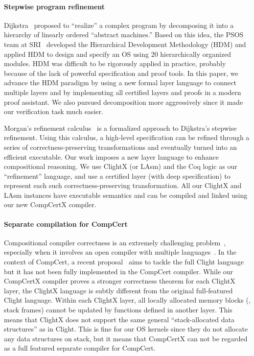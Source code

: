 \paragraph{Stepwise program refinement}
Dijkstra~\cite{Dijkstra72} proposed to ``realize'' a complex program
by decomposing it into a hierarchy of linearly ordered ``abstract
machines.''  Based on this idea, the PSOS team at SRI~\cite{psos80}
developed the Hierarchical Development Methodology (HDM) and applied
HDM to design and specify an OS using 20 hierarchically organized
modules. HDM was difficult to be rigorously applied in practice,
probably because of the lack of powerful specification and proof
tools. In this paper, we advance the HDM paradigm by using a new formal
layer language to connect multiple layers and by implementing all
certified layers and proofs in a modern proof assistant. We also
pursued decomposition more aggressively since it made our
verification task much easier.

Morgan's refinement calculus~\cite{morgan94} is a formalized approach
to Dijkstra's stepwise refinement. Using this calculus, a high-level
specification can be refined through a series of
correctness-preserving transformations and eventually turned into an
efficient executable. Our work imposes a new layer language to enhance
compositional reasoning. We use ClightX (or
LAsm) and the Coq logic as our ``refinement'' language,
and use a certified layer (with deep specification)
to represent each such correctness-preserving transformation.
All our ClightX and LAsm instances have executable semantics and can be
compiled and linked using our new CompCertX compiler.

\paragraph{Separate compilation for CompCert} Compositional 
compiler correctness is an extremely challenging
problem~\cite{BentonH09,hur12}, especially when it involves an open
compiler with multiple languages~\cite{perconti14}.  In the context of
CompCert, a recent proposal~\cite{beringer14}
aims to tackle the full Clight language but it has not been
fully implemented in the CompCert compiler.  While our CompCertX
compiler proves a stronger correctness theorem for each ClightX layer,
the ClightX language is subtly different from the original
full-featured Clight language. Within each ClightX layer, all locally
allocated memory blocks (\eg, stack frames) cannot be updated by
functions defined in another layer. This means that ClightX does not
support the same general ``stack-allocated data structures'' as in
Clight. This is fine for our OS kernels since they do not allocate any
data structures on stack, but it means that CompCertX can not be
regarded as a full featured separate compiler for CompCert.


